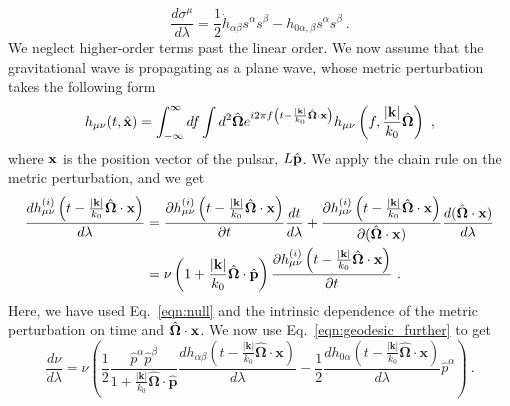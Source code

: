 \documentclass[prd,aps,psfig,nofootinbib,nobibnotes,superscriptaddress,preprintnumbers,times]{revtex4-2}\setlength{\topmargin}{-14mm}
\begin{document}
\begin{equation}\label{eqn:geodesic_further}
    \frac{d\sigma^\mu}{d\lambda} = \frac{1}{2}\dot{h}_{\alpha \beta} s^\alpha s^\beta - h_{0\alpha, \beta} s^\alpha s^\beta \ .
\end{equation}
We neglect higher-order terms past the linear order. We now assume that the gravitational wave is propagating as a plane wave, whose metric perturbation takes the following form 
\begin{equation}\label{eqn:plane_wave}
    h_{\mu \nu}(t, \hat{\bf x}) = \int_{-\infty}^\infty df \int d^2 \hat{\bf \Omega} e^{i2\pi f \left(t - \frac{|{\bf k}|}{k_0} \hat{\bf \Omega}\cdot {\bf x}\right)}h_{\mu \nu}\left(f, \frac{|{\bf k}|}{k_0} \hat{\bf \Omega} \right) \ ,
\end{equation}
where ${\bf x}$ is the position vector of the pulsar, $L\hat{\bf p}$. We apply the chain rule on the metric perturbation, and we get
\begin{equation}\label{eqn:dhdlambda}
    \begin{aligned}
        \frac{dh^{(i)}_{\mu \nu} \left(t - \frac{|{\bf k}|}{k_0} \hat{\bf \Omega}\cdot {\bf x}\right) }{d\lambda } &= \frac{\partial h^{(i)}_{\mu \nu}\left(t - \frac{|{\bf k}|}{k_0} \hat{\bf \Omega}\cdot {\bf x}\right) }{\partial t} \frac{dt}{d \lambda} + \frac{\partial h^{(i)}_{\mu \nu}\left(t - \frac{|{\bf k}|}{k_0} \hat{\bf \Omega}\cdot {\bf x}\right) }{\partial (\hat{\bf \Omega}\cdot {\bf x})} \frac{d(\hat{\bf \Omega}\cdot {\bf x})}{d \lambda} \\ &= \nu\left( 1 + \frac{|{\bf k}|}{k_0} \hat{\bf \Omega}\cdot \hat{\bf p}\right) \frac{\partial h^{(i)}_{\mu \nu}\left(t - \frac{|{\bf k}|}{k_0} \hat{\bf \Omega}\cdot {\bf x}\right) }{\partial t} \ .
    \end{aligned}
\end{equation}
Here, we have used Eq.\ \ref{eqn:null} and the intrinsic dependence of the metric perturbation on time and $\hat{\bf \Omega}\cdot {\bf x}$. We now use Eq.\ \ref{eqn:geodesic_further} to get 
\begin{equation}\label{eqn:dnudl}
    \frac{d\nu}{d\lambda} = \nu \left( \frac{1}{2} \frac{\hat{p}^\alpha \hat{p}^\beta}{1+\frac{|\boldsymbol{k}|}{k_0} \hat{\boldsymbol{\Omega}} \cdot \hat{\boldsymbol{p}}}\frac{d h_{\alpha \beta}\left(t - \frac{|\boldsymbol{k}|}{k_0} \hat{\boldsymbol{\Omega}} \cdot {\boldsymbol{x}}\right)}{d \lambda} - \frac{1}{2} \frac{dh_{0\alpha}\left(t - \frac{|\boldsymbol{k}|}{k_0} \hat{\boldsymbol{\Omega}} \cdot {\boldsymbol{x}}\right)}{d\lambda}\hat{p}^\alpha \right) \ .
\end{equation}
\end{document}
